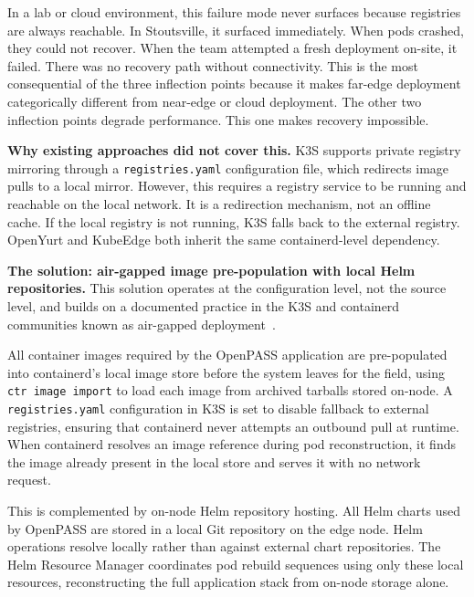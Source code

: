 In a lab or cloud environment, this failure mode never surfaces because registries are always reachable. In Stoutsville, it surfaced immediately. When pods crashed, they could not recover. When the team attempted a fresh deployment on-site, it failed. There was no recovery path without connectivity. This is the most consequential of the three inflection points because it makes far-edge deployment categorically different from near-edge or cloud deployment. The other two inflection points degrade performance. This one makes recovery impossible.

\textbf{Why existing approaches did not cover this.} K3S supports private registry mirroring through a \texttt{registries.yaml} configuration file, which redirects image pulls to a local mirror. However, this requires a registry service to be running and reachable on the local network. It is a redirection mechanism, not an offline cache. If the local registry is not running, K3S falls back to the external registry. OpenYurt and KubeEdge both inherit the same containerd-level dependency.

\textbf{The solution: air-gapped image pre-population with local Helm repositories.} This solution operates at the configuration level, not the source level, and builds on a documented practice in the K3S and containerd communities known as air-gapped deployment~\cite{k3sdocs2024}.

All container images required by the OpenPASS application are pre-populated into containerd's local image store before the system leaves for the field, using \texttt{ctr image import} to load each image from archived tarballs stored on-node. A \texttt{registries.yaml} configuration in K3S is set to disable fallback to external registries, ensuring that containerd never attempts an outbound pull at runtime. When containerd resolves an image reference during pod reconstruction, it finds the image already present in the local store and serves it with no network request.

This is complemented by on-node Helm repository hosting. All Helm charts used by OpenPASS are stored in a local Git repository on the edge node. Helm operations resolve locally rather than against external chart repositories. The Helm Resource Manager coordinates pod rebuild sequences using only these local resources, reconstructing the full application stack from on-node storage alone.

